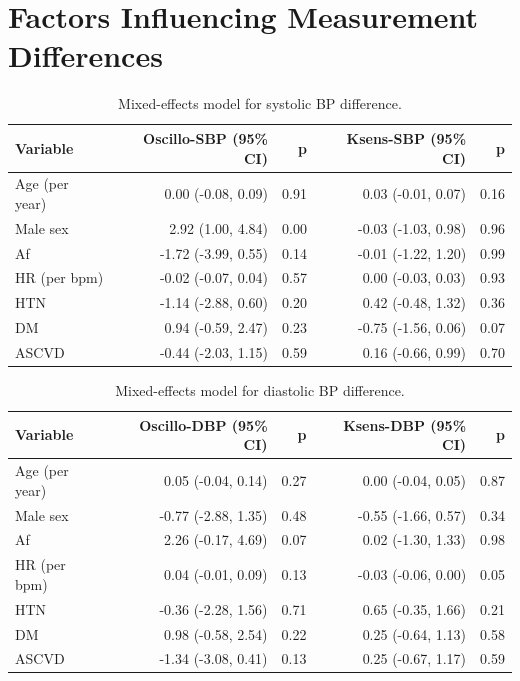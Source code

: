 \documentclass[
  12pt,
  letterpaper,
  openany,
  oneside]{book}
\begin{document}
\clearpage

\section{Factors Influencing Measurement
Differences}\label{factors-influencing-measurement-differences}

\begin{table}
\caption{Mixed-effects model for systolic BP difference.}\tabularnewline

\fontsize{12.0pt}{14.0pt}\selectfont
\begin{tabular*}{\linewidth}{@{\extracolsep{\fill}}lrrrr}
\toprule
{\bfseries Variable} & {\bfseries Oscillo-SBP (95\% CI)} & {\bfseries p} & {\bfseries Ksens-SBP (95\% CI)} & {\bfseries p} \\ 
\midrule\addlinespace[2.5pt]
Age (per year) & 0.00 (-0.08, 0.09) & 0.91 & 0.03 (-0.01, 0.07) & 0.16 \\ 
Male sex & 2.92 (1.00, 4.84) & 0.00 & -0.03 (-1.03, 0.98) & 0.96 \\ 
Af & -1.72 (-3.99, 0.55) & 0.14 & -0.01 (-1.22, 1.20) & 0.99 \\ 
HR (per bpm) & -0.02 (-0.07, 0.04) & 0.57 & 0.00 (-0.03, 0.03) & 0.93 \\ 
HTN & -1.14 (-2.88, 0.60) & 0.20 & 0.42 (-0.48, 1.32) & 0.36 \\ 
DM & 0.94 (-0.59, 2.47) & 0.23 & -0.75 (-1.56, 0.06) & 0.07 \\ 
ASCVD & -0.44 (-2.03, 1.15) & 0.59 & 0.16 (-0.66, 0.99) & 0.70 \\ 
\bottomrule
\end{tabular*}
\end{table}

\begin{table}
\caption{Mixed-effects model for diastolic BP difference.}\tabularnewline

\fontsize{12.0pt}{14.0pt}\selectfont
\begin{tabular*}{\linewidth}{@{\extracolsep{\fill}}lrrrr}
\toprule
{\bfseries Variable} & {\bfseries Oscillo-DBP (95\% CI)} & {\bfseries p} & {\bfseries Ksens-DBP (95\% CI)} & {\bfseries p} \\ 
\midrule\addlinespace[2.5pt]
Age (per year) & 0.05 (-0.04, 0.14) & 0.27 & 0.00 (-0.04, 0.05) & 0.87 \\ 
Male sex & -0.77 (-2.88, 1.35) & 0.48 & -0.55 (-1.66, 0.57) & 0.34 \\ 
Af & 2.26 (-0.17, 4.69) & 0.07 & 0.02 (-1.30, 1.33) & 0.98 \\ 
HR (per bpm) & 0.04 (-0.01, 0.09) & 0.13 & -0.03 (-0.06, 0.00) & 0.05 \\ 
HTN & -0.36 (-2.28, 1.56) & 0.71 & 0.65 (-0.35, 1.66) & 0.21 \\ 
DM & 0.98 (-0.58, 2.54) & 0.22 & 0.25 (-0.64, 1.13) & 0.58 \\ 
ASCVD & -1.34 (-3.08, 0.41) & 0.13 & 0.25 (-0.67, 1.17) & 0.59 \\ 
\bottomrule
\end{tabular*}
\end{table}
\end{document}
